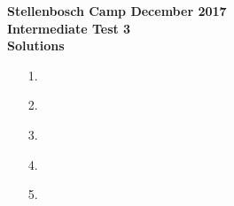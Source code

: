 \documentclass[a4paper,12pt]{article}
\begin{document}
\begin{center}
\textbf{Stellenbosch Camp December 2017 \\ Intermediate Test 3} \\
\textbf{Solutions}
\end{center}


\begin{enumerate}
    
    \item[1.] 
    
    
    \item[2.] 
    
    
    \item[3.] 
    
    
    \item[4.]     

    \item[5.]  %
    

\end{enumerate}
\end{document}

